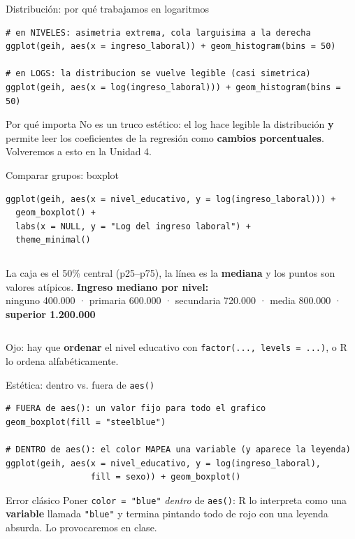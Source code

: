 \documentclass[10pt]{beamer}
\begin{document}
\begin{frame}[fragile]{Distribución: por qué trabajamos en logaritmos}
\begin{lstlisting}
# en NIVELES: asimetria extrema, cola larguisima a la derecha
ggplot(geih, aes(x = ingreso_laboral)) + geom_histogram(bins = 50)

# en LOGS: la distribucion se vuelve legible (casi simetrica)
ggplot(geih, aes(x = log(ingreso_laboral))) + geom_histogram(bins = 50)
\end{lstlisting}
  \begin{block}{Por qué importa}
    No es un truco estético: el log hace legible la distribución \textbf{y} permite leer los coeficientes de la regresión como \textbf{cambios porcentuales}. Volveremos a esto en la Unidad 4.
  \end{block}
\end{frame}

\begin{frame}[fragile]{Comparar grupos: boxplot}
\begin{lstlisting}
ggplot(geih, aes(x = nivel_educativo, y = log(ingreso_laboral))) +
  geom_boxplot() +
  labs(x = NULL, y = "Log del ingreso laboral") +
  theme_minimal()
\end{lstlisting}
  \begin{columns}[T]
    \small La caja es el 50\% central (p25--p75), la línea es la \textbf{mediana} y los puntos son valores atípicos.
    \small\textbf{Ingreso mediano por nivel:}\\
    ninguno 400.000 · primaria 600.000 · secundaria 720.000 · media 800.000 · \textbf{superior 1.200.000}
  \end{columns}
  \medskip
  \small Ojo: hay que \textbf{ordenar} el nivel educativo con \texttt{factor(..., levels = ...)}, o R lo ordena alfabéticamente.
\end{frame}

\begin{frame}[fragile]{Estética: dentro vs. fuera de \texttt{aes()}}
\begin{lstlisting}
# FUERA de aes(): un valor fijo para todo el grafico
geom_boxplot(fill = "steelblue")

# DENTRO de aes(): el color MAPEA una variable (y aparece la leyenda)
ggplot(geih, aes(x = nivel_educativo, y = log(ingreso_laboral),
                 fill = sexo)) + geom_boxplot()
\end{lstlisting}
  \begin{alertblock}{Error clásico}
    Poner \texttt{color = "blue"} \emph{dentro} de \texttt{aes()}: R lo interpreta como una \textbf{variable} llamada \texttt{"blue"} y termina pintando todo de rojo con una leyenda absurda. Lo provocaremos en clase.
  \end{alertblock}
\end{frame}
\end{document}
